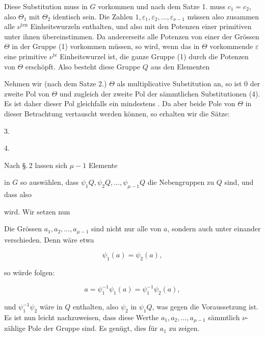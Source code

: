Diese Substitution muss in $G$ vorkommen und nach dem Satze 1. muss $c_1 = c_2$, also $\Theta_1$ mit $\Theta_2$ identisch sein. Die Zahlen $1, \varepsilon_1, \varepsilon_2, \ldots, \varepsilon_{\nu-1}$ müssen also zusammen alle $\nu^{\text{ten}}$ Einheitswurzeln enthalten, und also mit den Potenzen einer primitiven unter ihnen übereinstimmen. Da andererseits alle Potenzen von einer der Grössen $\Theta$ in der Gruppe (1) vorkommen müssen, so wird, wenn das in $\Theta$ vorkommende $\varepsilon$ eine primitive $\nu^{\text{te}}$ Einheitswurzel ist, die ganze Gruppe (1) durch die Potenzen von $\Theta$ erschöpft. %
Also besteht diese Gruppe $Q$ aus den Elementen


Nehmen wir (nach dem Satze 2.) $\Theta$ als multiplicative Substitution an, so ist 0 der zweite Pol von $\Theta$ und zugleich der zweite Pol der sämmtlichen Substitutionen (4). Es ist daher dieser Pol gleichfalls ein mindestens . Da aber beide Pole von $\Theta$ in dieser Betrachtung vertauscht werden können, so erhalten wir die Sätze:

3. 

4. 

Nach \S.\,2 lassen sich $\mu - 1$ Elemente


in $G$ so auswählen, dass $\psi_1 Q, \psi_2 Q, \ldots, \psi_{\mu-1} Q$ die Nebengruppen zu $Q$ sind, und dass also


wird. Wir setzen nun


Die Grössen $a_1, a_2, \ldots, a_{\mu-1}$ sind nicht nur alle von $a$, sondern auch unter einander verschieden. Denn wäre etwa

\[ \psi_1(a) = \psi_2(a), \]

so würde folgen:

\[ a = \psi_1^{-1}\psi_1(a) = \psi_1^{-1}\psi_2(a), \]

und $\psi_1^{-1}\psi_2$ wäre in $Q$ enthalten, also $\psi_2$ in $\psi_1 Q$, was gegen die Voraussetzung ist. Es ist nun leicht nachzuweisen, dass diese Werthe $a_1, a_2, \ldots, a_{\mu-1}$ sämmtlich $\nu$-zählige Pole der Gruppe sind. Es genügt, dies für $a_1$ zu zeigen.
